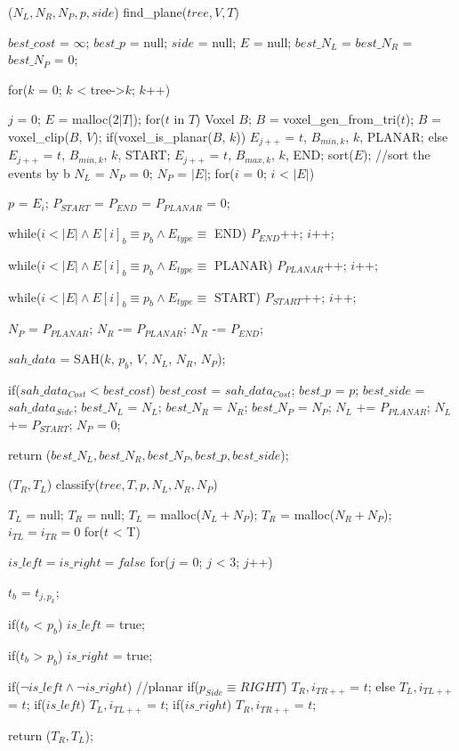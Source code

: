\documentclass[12pt,letterpaper]{article}
\begin{document}
\begin{algorithm}[caption={Find Split Plane O(n log n).}, label={alg1}]
  ($N_L, N_R, N_P, p, side$) find_plane($tree, V, T$)
  {
    $best\_cost$ = $\infty$; $best\_p$ = null; $side$ = null; $E$ = null;
    $best\_N_L$ =  $best\_N_R$ =  $best\_N_P$ = 0;

    for($k$ = 0; $k$ < tree->$k$; $k$++)
    {
      $j$ = 0;
      $E$ = malloc($2 |T|$);
      for($t$ in $T$)
      {
        Voxel $B$;
        $B$ = voxel_gen_from_tri($t$);
        $B$ = voxel_clip($B$, $V$);
        if(voxel_is_planar($B$, $k$))
        {
          $E_{j++}$ = {$t$, $B_{min,k}$, $k$, PLANAR};
        }
        else
        {
          $E_{j++}$ = {$t$, $B_{min,k}$, $k$, START};
          $E_{j++}$ = {$t$, $B_{max,k}$, $k$, END};
        }
      }
      sort($E$); //sort the events by b
      $N_L$ = $N_P$ = 0;
      $N_P$ = $|E|$;
      for($i$ = 0; $i$ < $|E|$)
      {
        $p$ = $E_i$;
        $P_{START}$ = $P_{END}$ = $P_{PLANAR}$ = 0;

        while($i < |E| \land E[i]_b \equiv  p_b \land E_{type} \equiv$ END)
        {$P_{END}$++; $i$++;}

        while($i < |E| \land E[i]_b \equiv  p_b \land E_{type} \equiv$ PLANAR)
        {$P_{PLANAR}$++; $i$++;}

        while($i < |E| \land E[i]_b \equiv  p_b \land E_{type} \equiv$ START)
        {$P_{START}$++; $i$++;}

        $N_P$ =  $P_{PLANAR}$; $N_R$ -= $P_{PLANAR}$; $N_R$ -= $P_{END}$;

        $sah\_data$ = SAH($k$, $p_b$, $V$, $N_L$, $N_R$, $N_P$);

        if($sah\_data_{Cost} < best\_cost$)
        {
          $best\_cost$ = $sah\_data_{Cost}$;
          $best\_p$    = $p$;
          $best\_side$ = $sah\_data_{Side}$;
          $best\_N_L$  = $N_L$; $best\_N_R$  = $N_R$; $best\_N_P$  = $N_P$;
        }
        $N_L$ += $P_{PLANAR}$; $N_L$ += $P_{START}$; $N_P$ =  0;
      }
    }
    return ($best\_N_L, best\_N_R, best\_N_P, best\_p, best\_side$);
  }
\end{algorithm}
\newpage
\begin{algorithm}[caption={Classify.}, label={alg1}]
  ($T_R, T_L$) classify($tree, T, p, N_L, N_R, N_P$)
  {
    $T_L$ = null; $T_R$ = null;
    $T_L$ = malloc($N_L + N_P$);
    $T_R$ = malloc($N_R + N_P$);
    $i_{TL} = i_{TR} = 0$
    for($t$ < T)
    {
      $is\_left = is\_right = false$
      for($j$ = 0; $j$ < 3; $j$++)
      {
        $t_b$ = $t_{j,p_k}$;

        if($t_b$ < $p_b$)
          $is\_left$ = true;

        if($t_b$ > $p_b$)
          $is\_right$ = true;
      }

      if($\neg is\_left \land \neg is\_right$) //planar
      {
        if($p_{Side} \equiv RIGHT$)
          $T_R,{i_{TR++}}$ = $t$;
        else
          $T_L,{i_{TL++}}$ = $t$;
      }
      if($is\_left$)
        $T_L,{i_{TL++}}$ = $t$;
      if($is\_right$)
        $T_R,{i_{TR++}}$ = $t$;
    }
    return ($T_R, T_L$);
  }
\end{algorithm}
\end{document}
